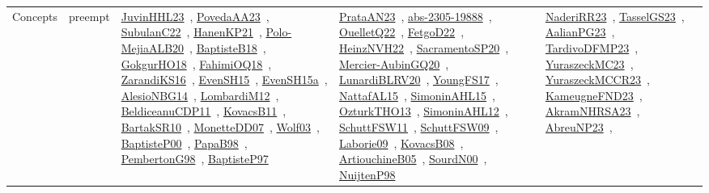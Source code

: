 {\begin{longtable}{lp{3cm}>{\raggedright\arraybackslash}p{6cm}>{\raggedright\arraybackslash}p{6cm}>{\raggedright\arraybackslash}p{8cm}}
Concepts & preempt & \href{works/JuvinHHL23.pdf}{JuvinHHL23}~\cite{JuvinHHL23}, \href{works/PovedaAA23.pdf}{PovedaAA23}~\cite{PovedaAA23}, \href{works/SubulanC22.pdf}{SubulanC22}~\cite{SubulanC22}, \href{works/HanenKP21.pdf}{HanenKP21}~\cite{HanenKP21}, \href{works/Polo-MejiaALB20.pdf}{Polo-MejiaALB20}~\cite{Polo-MejiaALB20}, \href{works/BaptisteB18.pdf}{BaptisteB18}~\cite{BaptisteB18}, \href{works/GokgurHO18.pdf}{GokgurHO18}~\cite{GokgurHO18}, \href{works/FahimiOQ18.pdf}{FahimiOQ18}~\cite{FahimiOQ18}, \href{works/ZarandiKS16.pdf}{ZarandiKS16}~\cite{ZarandiKS16}, \href{works/EvenSH15.pdf}{EvenSH15}~\cite{EvenSH15}, \href{works/EvenSH15a.pdf}{EvenSH15a}~\cite{EvenSH15a}, \href{works/AlesioNBG14.pdf}{AlesioNBG14}~\cite{AlesioNBG14}, \href{works/LombardiM12.pdf}{LombardiM12}~\cite{LombardiM12}, \href{works/BeldiceanuCDP11.pdf}{BeldiceanuCDP11}~\cite{BeldiceanuCDP11}, \href{works/KovacsB11.pdf}{KovacsB11}~\cite{KovacsB11}, \href{works/BartakSR10.pdf}{BartakSR10}~\cite{BartakSR10}, \href{works/MonetteDD07.pdf}{MonetteDD07}~\cite{MonetteDD07}, \href{works/Wolf03.pdf}{Wolf03}~\cite{Wolf03}, \href{works/BaptisteP00.pdf}{BaptisteP00}~\cite{BaptisteP00}, \href{works/PapaB98.pdf}{PapaB98}~\cite{PapaB98}, \href{works/PembertonG98.pdf}{PembertonG98}~\cite{PembertonG98}, \href{works/BaptisteP97.pdf}{BaptisteP97}~\cite{BaptisteP97} & \href{works/PrataAN23.pdf}{PrataAN23}~\cite{PrataAN23}, \href{works/abs-2305-19888.pdf}{abs-2305-19888}~\cite{abs-2305-19888}, \href{works/OuelletQ22.pdf}{OuelletQ22}~\cite{OuelletQ22}, \href{works/FetgoD22.pdf}{FetgoD22}~\cite{FetgoD22}, \href{works/HeinzNVH22.pdf}{HeinzNVH22}~\cite{HeinzNVH22}, \href{works/SacramentoSP20.pdf}{SacramentoSP20}~\cite{SacramentoSP20}, \href{works/Mercier-AubinGQ20.pdf}{Mercier-AubinGQ20}~\cite{Mercier-AubinGQ20}, \href{works/LunardiBLRV20.pdf}{LunardiBLRV20}~\cite{LunardiBLRV20}, \href{works/YoungFS17.pdf}{YoungFS17}~\cite{YoungFS17}, \href{works/NattafAL15.pdf}{NattafAL15}~\cite{NattafAL15}, \href{works/SimoninAHL15.pdf}{SimoninAHL15}~\cite{SimoninAHL15}, \href{works/OzturkTHO13.pdf}{OzturkTHO13}~\cite{OzturkTHO13}, \href{works/SimoninAHL12.pdf}{SimoninAHL12}~\cite{SimoninAHL12}, \href{works/SchuttFSW11.pdf}{SchuttFSW11}~\cite{SchuttFSW11}, \href{works/SchuttFSW09.pdf}{SchuttFSW09}~\cite{SchuttFSW09}, \href{works/Laborie09.pdf}{Laborie09}~\cite{Laborie09}, \href{works/KovacsB08.pdf}{KovacsB08}~\cite{KovacsB08}, \href{works/ArtiouchineB05.pdf}{ArtiouchineB05}~\cite{ArtiouchineB05}, \href{works/SourdN00.pdf}{SourdN00}~\cite{SourdN00}, \href{works/NuijtenP98.pdf}{NuijtenP98}~\cite{NuijtenP98} & \href{works/NaderiRR23.pdf}{NaderiRR23}~\cite{NaderiRR23}, \href{works/TasselGS23.pdf}{TasselGS23}~\cite{TasselGS23}, \href{works/AalianPG23.pdf}{AalianPG23}~\cite{AalianPG23}, \href{works/TardivoDFMP23.pdf}{TardivoDFMP23}~\cite{TardivoDFMP23}, \href{works/YuraszeckMC23.pdf}{YuraszeckMC23}~\cite{YuraszeckMC23}, \href{works/YuraszeckMCCR23.pdf}{YuraszeckMCCR23}~\cite{YuraszeckMCCR23}, \href{works/KameugneFND23.pdf}{KameugneFND23}~\cite{KameugneFND23}, \href{works/AkramNHRSA23.pdf}{AkramNHRSA23}~\cite{AkramNHRSA23}, \href{works/AbreuNP23.pdf}{AbreuNP23}~\cite{AbreuNP23}, 
\end{longtable}}
